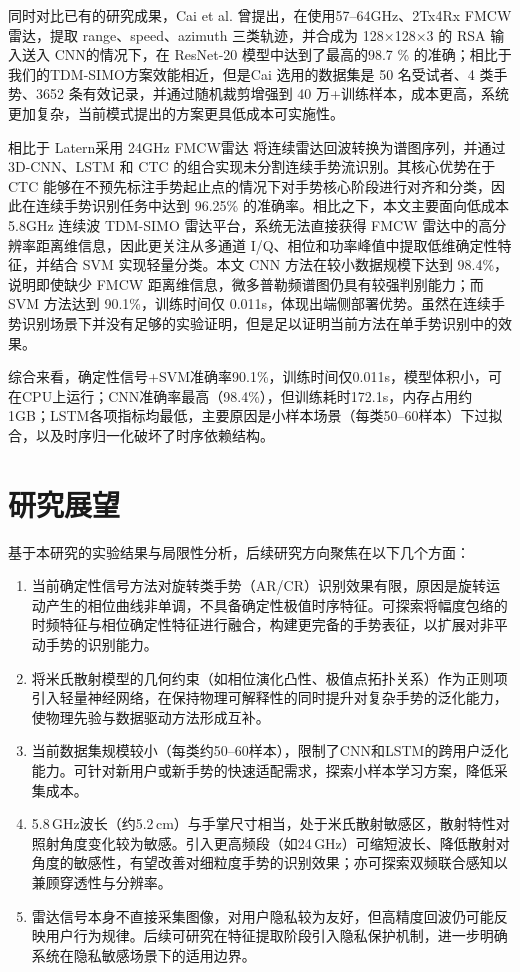 同时对比已有的研究成果，Cai et al.\cite{Cai_2019} 曾提出，在使用57–64GHz、2Tx4Rx FMCW 雷达，提取 range、speed、azimuth 三类轨迹，并合成为 128×128×3 的 RSA 输入送入 CNN的情况下，在 ResNet-20 模型中达到了最高的98.7 \% 的准确；相比于我们的TDM-SIMO方案效能相近，但是Cai 选用的数据集是 50 名受试者、4 类手势、3652 条有效记录，并通过随机裁剪增强到 40 万+训练样本，成本更高，系统更加复杂，当前模式提出的方案更具低成本可实施性。

相比于 Latern\cite{Latern}采用 24GHz FMCW雷达 将连续雷达回波转换为谱图序列，并通过 3D-CNN、LSTM 和 CTC 的组合实现未分割连续手势流识别。其核心优势在于 CTC 能够在不预先标注手势起止点的情况下对手势核心阶段进行对齐和分类，因此在连续手势识别任务中达到 96.25\% 的准确率。相比之下，本文主要面向低成本 5.8GHz 连续波 TDM-SIMO 雷达平台，系统无法直接获得 FMCW 雷达中的高分辨率距离维信息，因此更关注从多通道 I/Q、相位和功率峰值中提取低维确定性特征，并结合 SVM 实现轻量分类。本文 CNN 方法在较小数据规模下达到 98.4\%，说明即使缺少 FMCW 距离维信息，微多普勒频谱图仍具有较强判别能力；而 SVM 方法达到 90.1\%，训练时间仅 0.011s，体现出端侧部署优势。虽然在连续手势识别场景下并没有足够的实验证明，但是足以证明当前方法在单手势识别中的效果。

综合来看，确定性信号+SVM准确率90.1\%，训练时间仅0.011s，模型体积小，可在CPU上运行；CNN准确率最高（98.4\%），但训练耗时172.1s，内存占用约1GB；LSTM各项指标均最低，主要原因是小样本场景（每类50--60样本）下过拟合，以及时序归一化破坏了时序依赖结构。

\section{研究展望}

基于本研究的实验结果与局限性分析，后续研究方向聚焦在以下几个方面：

\begin{enumerate}[itemsep=0pt, parsep=0pt, topsep=0pt, partopsep=0pt]
    \item 当前确定性信号方法对旋转类手势（AR/CR）识别效果有限，原因是旋转运动产生的相位曲线非单调，不具备确定性极值时序特征。可探索将幅度包络的时频特征与相位确定性特征进行融合，构建更完备的手势表征，以扩展对非平动手势的识别能力。
    \item 将米氏散射模型的几何约束（如相位演化凸性、极值点拓扑关系）作为正则项引入轻量神经网络，在保持物理可解释性的同时提升对复杂手势的泛化能力，使物理先验与数据驱动方法形成互补。
    \item 当前数据集规模较小（每类约50--60样本），限制了CNN和LSTM的跨用户泛化能力。可针对新用户或新手势的快速适配需求，探索小样本学习方案，降低采集成本。
    \item 5.8\,GHz波长（约5.2\,cm）与手掌尺寸相当，处于米氏散射敏感区，散射特性对照射角度变化较为敏感。引入更高频段（如24\,GHz）可缩短波长、降低散射对角度的敏感性，有望改善对细粒度手势的识别效果；亦可探索双频联合感知以兼顾穿透性与分辨率。
    \item 雷达信号本身不直接采集图像，对用户隐私较为友好，但高精度回波仍可能反映用户行为规律。后续可研究在特征提取阶段引入隐私保护机制，进一步明确系统在隐私敏感场景下的适用边界。
\end{enumerate}

